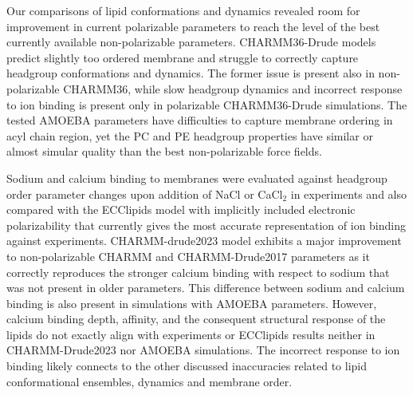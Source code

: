 \documentclass[journal=jacsat,manuscript=article,layout=singlecolumn]{achemso}
\begin{document}
Our comparisons of lipid conformations and dynamics revealed room for improvement in current polarizable parameters to reach the level of the best currently available non-polarizable parameters. CHARMM36-Drude models predict slightly too ordered membrane and struggle to correctly capture headgroup conformations and dynamics. The former issue is present also in non-polarizable CHARMM36, while slow headgroup dynamics and incorrect response to ion binding is present only in polarizable CHARMM36-Drude simulations.
%
The tested AMOEBA parameters have difficulties to capture membrane ordering in acyl chain region,  %
yet the PC and PE headgroup properties have similar or almost simular quality 
than the best non-polarizable force fields. 

Sodium and calcium binding to membranes were evaluated against headgroup order parameter changes upon addition of NaCl or CaCl$_2$ in experiments and also compared with the ECClipids model with implicitly included electronic polarizability that currently gives the most accurate representation of ion binding against experiments. 
CHARMM-drude2023 model exhibits a major improvement to non-polarizable CHARMM and CHARMM-Drude2017 parameters as it correctly reproduces the stronger calcium binding with respect to sodium that was not present in older parameters. This difference between sodium and calcium binding is also present in simulations with AMOEBA parameters. However, calcium
binding depth, affinity, and the consequent structural response of the lipids do not exactly align with experiments or ECClipids results neither in CHARMM-Drude2023 nor AMOEBA simulations. The incorrect response to ion binding likely connects to the other discussed inaccuracies related to lipid conformational ensembles, dynamics and membrane order.
\end{document}
